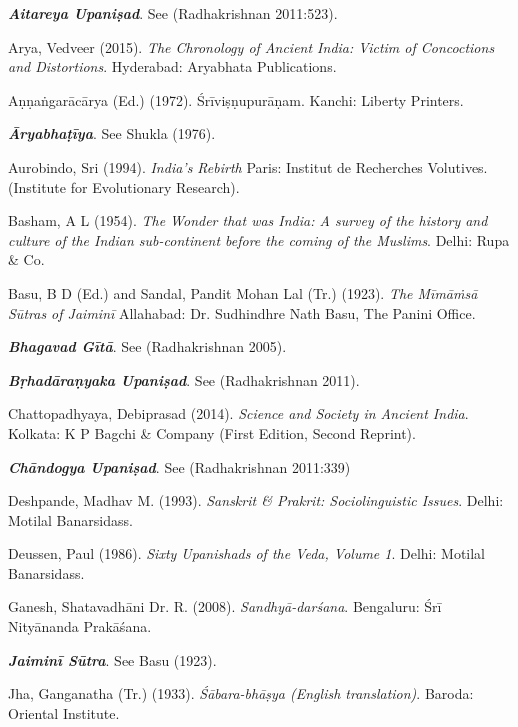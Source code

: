 \begin{thebibliography}{99}
\itemsep=1pt
{{\sl\bfseries Aitareya Upaniṣad}}. See (Radhakrishnan 2011:523).

Arya, Vedveer (2015). {\sl The Chronology of Ancient India: Victim of Concoctions and Distortions}. Hyderabad: Aryabhata Publications.

Aṇṇaṅgarācārya (Ed.) (1972). Śrīviṣṇupurāṇam. Kanchi: Liberty Printers. 

{{\sl\bfseries Āryabhaṭīya}}. See Shukla (1976).

Aurobindo, Sri (1994). {\sl India’s Rebirth} Paris: Institut de Recherches Volutives. (Institute for Evolutionary Research).

Basham, A L (1954). {\sl The Wonder that was India: A survey of the history and culture of the Indian sub-continent before the coming of the Muslims}. Delhi: Rupa \& Co.

Basu, B D (Ed.) and Sandal, Pandit Mohan Lal (Tr.) (1923). {\sl The Mīmāṁsā Sūtras of Jaiminī} Allahabad: Dr. Sudhindhre Nath Basu, The Panini Office.

{{\sl\bfseries Bhagavad Gītā}}. See (Radhakrishnan 2005).

{\sl\bfseries Bṛhadāraṇyaka Upaniṣad}. See (Radhakrishnan 2011).

Chattopadhyaya, Debiprasad (2014). {\sl Science and Society in Ancient India}. Kolkata: K P Bagchi \& Company (First Edition, Second Reprint).

{\sl\bfseries Chāndogya Upaniṣad}. See (Radhakrishnan 2011:339)

Deshpande, Madhav M. (1993). {\sl Sanskrit \& Prakrit: Sociolinguistic Issues}. Delhi: Motilal Banarsidass.

Deussen, Paul (1986). {\sl Sixty Upanishads of the Veda, Volume 1}. Delhi: Motilal Banarsidass.

Ganesh, Shatavadhāni Dr. R. (2008). {\sl Sandhyā-darśana}. Bengaluru: Śrī Nityānanda Prakāśana.

{{\sl\bfseries Jaiminī Sūtra}}. See Basu (1923).

Jha, Ganganatha (Tr.) (1933). {\sl Śābara-bhāṣya (English translation)}. Baroda: Oriental Institute.


\end{thebibliography}
